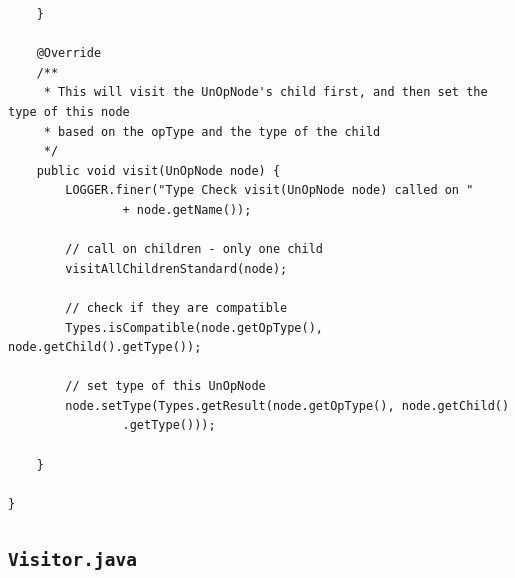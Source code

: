 \documentclass{book}
\begin{document}
\begin{verbatim}
	}

	@Override
	/**
	 * This will visit the UnOpNode's child first, and then set the type of this node
	 * based on the opType and the type of the child
	 */
	public void visit(UnOpNode node) {
		LOGGER.finer("Type Check visit(UnOpNode node) called on "
				+ node.getName());

		// call on children - only one child
		visitAllChildrenStandard(node);

		// check if they are compatible
		Types.isCompatible(node.getOpType(), node.getChild().getType());

		// set type of this UnOpNode
		node.setType(Types.getResult(node.getOpType(), node.getChild()
				.getType()));

	}

}
\end{verbatim}

\subsection{\texttt{Visitor.java}}
\end{document}
